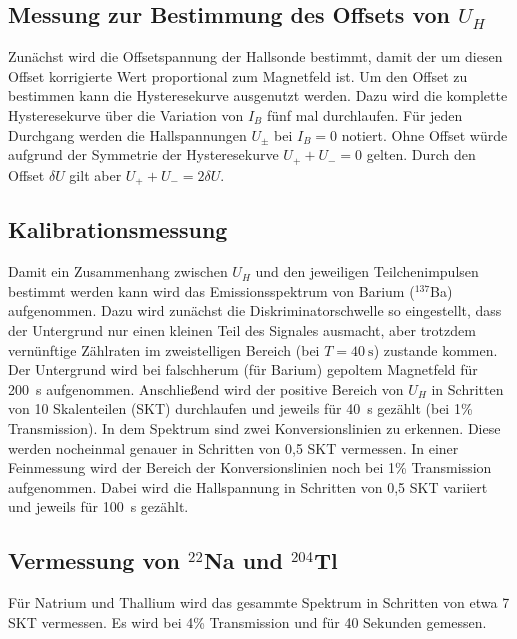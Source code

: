 \subsection{Messung zur Bestimmung des Offsets von $U_H$}
Zunächst wird die Offsetspannung der Hallsonde bestimmt, damit der um diesen Offset korrigierte Wert proportional zum Magnetfeld ist. Um den Offset zu bestimmen kann die Hysteresekurve ausgenutzt werden. Dazu wird die komplette Hysteresekurve über die Variation von $I_B$ fünf mal durchlaufen. Für jeden Durchgang werden die Hallspannungen $U_\pm$ bei $I_B=0$ notiert. Ohne Offset würde aufgrund der Symmetrie der Hysteresekurve $U_++U_-=0$ gelten. Durch den Offset $\delta U$ gilt aber $U_++U_-=2\delta U$. \\

\subsection{Kalibrationsmessung}
Damit ein Zusammenhang zwischen $U_H$ und den jeweiligen Teilchenimpulsen bestimmt werden kann wird das Emissionsspektrum von Barium ($^{137}$Ba) aufgenommen. Dazu wird zunächst die Diskriminatorschwelle so eingestellt, dass der Untergrund nur einen kleinen Teil des Signales ausmacht, aber trotzdem vernünftige Zählraten im zweistelligen Bereich (bei $T=\SI{40}{\second}$) zustande kommen. Der Untergrund wird bei falschherum (für Barium) gepoltem Magnetfeld für \SI{200}{\second} aufgenommen. Anschließend wird der positive Bereich von $U_H$ in Schritten von 10 Skalenteilen (SKT) durchlaufen und jeweils für \SI{40}{\second} gezählt (bei 1\% Transmission). In dem Spektrum sind zwei Konversionslinien zu erkennen. Diese werden nocheinmal genauer in Schritten von 0,5 SKT vermessen. In einer Feinmessung wird der Bereich der Konversionslinien noch bei 1\% Transmission aufgenommen. Dabei wird die Hallspannung in Schritten von  0,5 SKT variiert und jeweils für \SI{100}{\second} gezählt.

\subsection{Vermessung von $^{22}$Na und $^{204}$Tl}
Für Natrium und Thallium wird das gesammte Spektrum in Schritten von etwa 7 SKT vermessen. Es wird bei 4\% Transmission und für 40 Sekunden gemessen. 
